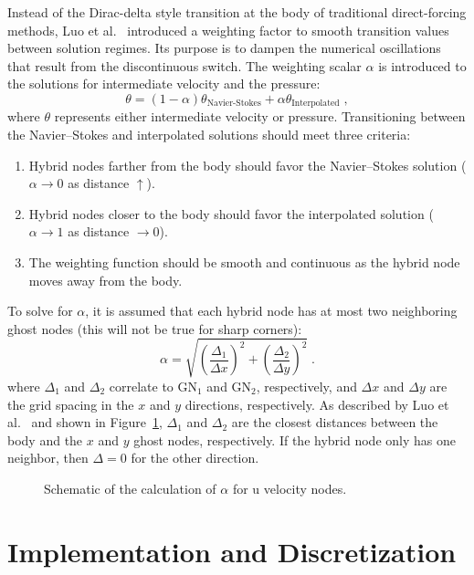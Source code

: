 Instead of the Dirac-delta style transition at the body of traditional direct-forcing methods, Luo et al.~\cite{Luo:2012gx} introduced a weighting factor to smooth transition values between solution regimes. 
Its purpose is to dampen the numerical oscillations that result from the discontinuous switch. 
The weighting scalar $\alpha$ is introduced to the solutions for intermediate velocity and the pressure:
\begin{equation}\label{eq:Weight}
\theta = \left(1-\alpha \right)\theta_{\text{Navier-Stokes}} + \alpha \theta_{\text{Interpolated}} \;,
\end{equation}
where $\theta$ represents either intermediate velocity or pressure.
Transitioning between the Navier--Stokes and interpolated solutions should meet three criteria:
\begin{enumerate}
	\item Hybrid nodes farther from the body should favor the Navier--Stokes solution ($\alpha \rightarrow 0$ as distance $\uparrow$).
	\item Hybrid nodes closer to the body should favor the interpolated solution ($\alpha \rightarrow 1$ as distance $ \rightarrow 0$).
	\item The weighting function should be smooth and continuous as the hybrid node moves away from the body.
\end{enumerate}
To solve for $\alpha$, it is assumed that each hybrid node has at most two neighboring ghost nodes (this will not be true for sharp corners):
\begin{equation}
\alpha = \sqrt{\left(\frac{\Delta_1}{\Delta x}\right)^2 + \left(\frac{\Delta_2}{\Delta y}\right)^2} \;.
\label{eq:Alpha}
\end{equation}
where $\Delta_1$ and $\Delta_2$ correlate to GN$_1$ and GN$_2$, respectively, and $\Delta x$ and $\Delta y$ are the grid spacing in the $x$ and $y$ directions, respectively. 
As described by Luo et al.~\cite{Luo:2012gx} and shown in Figure~\ref{fig:Weight}, $\Delta_1$ and $\Delta_2$ are the closest distances between the body and the $x$ and $y$ ghost nodes, respectively. 
If the hybrid node only has one neighbor, then $\Delta=0$ for the other direction. 
\begin{figure}[!htb]
	\centering
	
	\caption{Schematic of the calculation of $\alpha$ for u velocity nodes.}
	\label{fig:Weight}
\end{figure}

\chapter{Implementation and Discretization}\label{chapter:Implementation}
